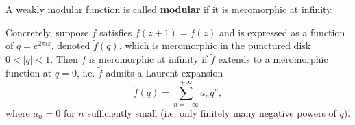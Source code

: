 A weakly modular function is called \textbf{modular} if it is meromorphic at infinity.

Concretely, suppose $f$ satisfies $f(z+1) = f(z)$ and is expressed as a function of $q = e^{2\pi i z}$, denoted $\tilde{f}(q)$, which is meromorphic in the punctured disk $0 < |q| < 1$. Then $f$ is meromorphic at infinity if $\tilde{f}$ extends to a meromorphic function at $q = 0$, i.e. $\tilde{f}$ admits a Laurent expansion
$$\tilde{f}(q) = \sum_{n=-\infty}^{+\infty} a_n q^n,$$
where $a_n = 0$ for $n$ sufficiently small (i.e. only finitely many negative powers of $q$).
